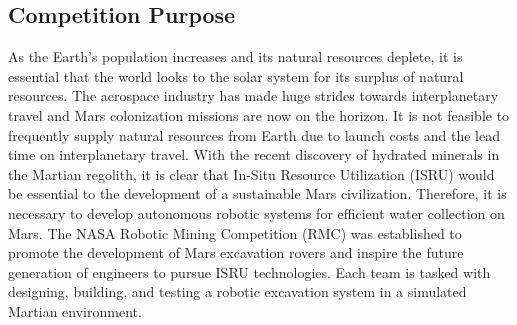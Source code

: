 \documentclass[class=article, crop=false]{standalone}
\begin{document}
	\subsection{Competition Purpose}
	\label{subsec:competition_purpose}
	
	
As the Earth's population increases and its natural resources deplete, it is essential that the world looks to the solar system for its surplus of natural resources. The aerospace industry has made huge strides towards interplanetary travel and Mars colonization missions are now on the horizon. It is not feasible to frequently supply natural resources from Earth due to launch costs and the lead time on interplanetary travel. With the recent discovery of hydrated minerals in the Martian regolith, it is clear that In-Situ Resource Utilization (ISRU) would be essential to the development of a sustainable Mars civilization. Therefore, it is necessary to develop autonomous robotic systems for efficient water collection on Mars. The NASA Robotic Mining Competition (RMC) was established to promote the development of Mars excavation rovers and inspire the future generation of engineers to pursue ISRU technologies. Each team is tasked with designing, building, and testing a robotic excavation system in a simulated Martian environment. 
	
	
\end{document}

